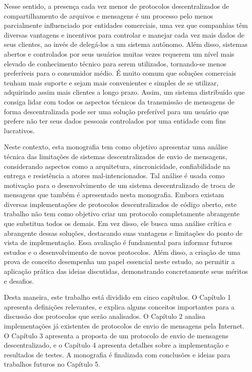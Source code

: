 Nesse sentido, a presença cada vez menor de protocolos descentralizados de compartilhamento de arquivos e mensagens é um processo pelo menos parcialmente influenciado por entidades comerciais, uma vez que companhias têm diversas vantagens e incentivos para controlar e manejar cada vez mais dados de seus clientes, ao invés de delegá-los a um sistema autônomo. Além disso, sistemas abertos e controlados por seus usuários muitas vezes requerem um nível mais elevado de conhecimento técnico para serem utilizados, tornando-se menos preferíveis para o consumidor médio. É muito comum que soluções comerciais tenham mais suporte e sejam mais convenientes e simples de se utilizar, adquirindo assim mais clientes a longo prazo. Assim, um sistema distribuído que consiga lidar com todos os aspectos técnicos da transmissão de mensagens de forma descentralizada pode ser uma solução preferível para um usuário que prefere não ter seus dados pessoais controlados por uma entidade com fins lucrativos. 

Neste contexto, esta monografia tem como objetivo apresentar uma análise técnica das limitações de sistemas descentralizados de envio de mensagens, considerando aspectos como a arquitetura, sincronicidade, confiabilidade na entrega e resistência a atores mal-intencionados. Tal análise é usada como motivação para o desenvolvimento de um sistema descentralizado de troca de mensagens que também é apresentado nesta monografia. Embora existam diversas implementações de protocolos descentralizados de código aberto, este trabalho não tem como objetivo criar um protocolo completamente abrangente que substitua todos os demais. Em vez disso, ele busca uma análise crítica e abrangente dessas soluções, destacando suas vantagens e limitações do ponto de vista de implementação. Essa avaliação é fundamental para informar futuros estudos e o desenvolvimento de novos protocolos. Além disso, a criação de uma prova de conceito desempenha um papel essencial neste estudo, ao permitir a aplicação prática das ideias discutidas, demonstrando concretamente seus méritos e desafios.

Desta maneira, este trabalho está dividido em cinco capítulos. O Capítulo 1 apresenta definições relevantes, e explica alguns conceitos importantes para a discussão dos protocolos que serão analisados. O Capítulo 2 analisa implementações já existentes de protocolos de envio de mensagens pela Internet. O Capítulo 3 apresenta a proposta de um protocolo de envio de mensagens descentralizado, e o Capítulo 4 apresenta detalhes sobre a implementação e resultados de testes. A monografia é finalizada com conclusões e ideias para trabalhos futuros no Capítulo 5.
